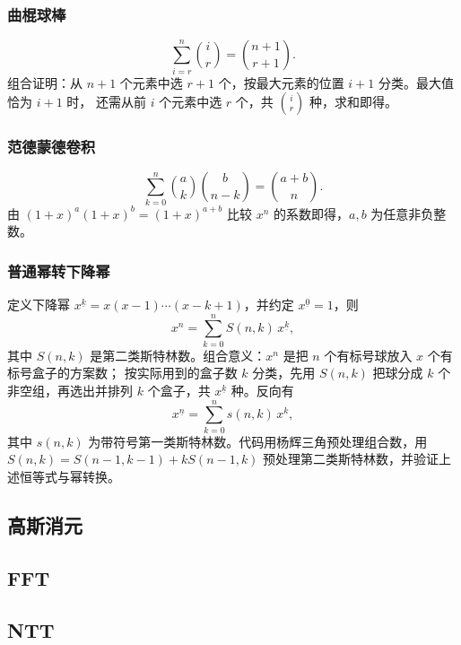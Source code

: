 \documentclass[11pt,a4paper,twocolumn]{ctexart}  %
\begin{document}
\subsubsection*{曲棍球棒}
\[
\sum_{i=r}^{n}\binom{i}{r}=\binom{n+1}{r+1}.
\]
组合证明：从 $n+1$ 个元素中选 $r+1$ 个，按最大元素的位置 $i+1$ 分类。最大值恰为 $i+1$ 时，
还需从前 $i$ 个元素中选 $r$ 个，共 $\binom{i}{r}$ 种，求和即得。

\subsubsection*{范德蒙德卷积}
\[
\sum_{k=0}^{n}\binom{a}{k}\binom{b}{n-k}=\binom{a+b}{n}.
\]
由 $(1+x)^a(1+x)^b=(1+x)^{a+b}$ 比较 $x^n$ 的系数即得，$a,b$ 为任意非负整数。

\subsubsection*{普通幂转下降幂}
定义下降幂 $x^{\underline{k}}=x(x-1)\cdots(x-k+1)$，并约定 $x^{\underline0}=1$，则
\[
x^n=\sum_{k=0}^{n} S(n,k)\,x^{\underline{k}},
\]
其中 $S(n,k)$ 是第二类斯特林数。组合意义：$x^n$ 是把 $n$ 个有标号球放入 $x$ 个有标号盒子的方案数；
按实际用到的盒子数 $k$ 分类，先用 $S(n,k)$ 把球分成 $k$ 个非空组，再选出并排列 $k$ 个盒子，共
$x^{\underline{k}}$ 种。反向有
\[
x^{\underline{n}}=\sum_{k=0}^{n}s(n,k)\,x^k,
\]
其中 $s(n,k)$ 为带符号第一类斯特林数。代码用杨辉三角预处理组合数，用
$S(n,k)=S(n-1,k-1)+kS(n-1,k)$ 预处理第二类斯特林数，并验证上述恒等式与幂转换。

\subsection{高斯消元}


\subsection{FFT}


\subsection{NTT}

\end{document}
